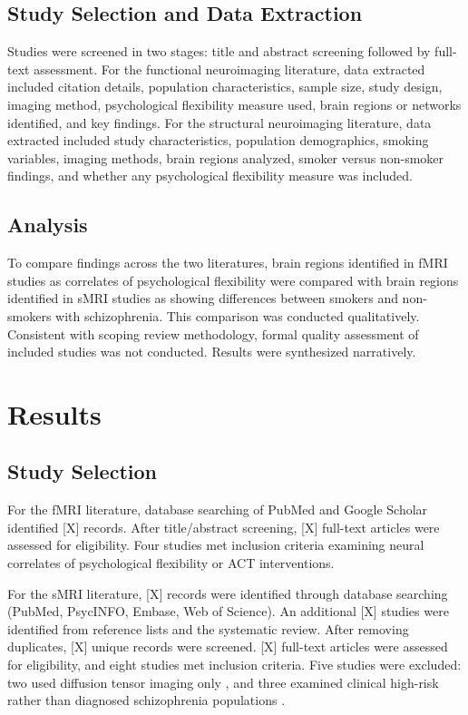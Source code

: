 \documentclass[12pt]{article}
\begin{document}
\subsection{Study Selection and Data Extraction}

Studies were screened in two stages: title and abstract screening followed by full-text assessment. For the functional neuroimaging literature, data extracted included citation details, population characteristics, sample size, study design, imaging method, psychological flexibility measure used, brain regions or networks identified, and key findings. For the structural neuroimaging literature, data extracted included study characteristics, population demographics, smoking variables, imaging methods, brain regions analyzed, smoker versus non-smoker findings, and whether any psychological flexibility measure was included.

\subsection{Analysis}

To compare findings across the two literatures, brain regions identified in fMRI studies as correlates of psychological flexibility were compared with brain regions identified in sMRI studies as showing differences between smokers and non-smokers with schizophrenia. This comparison was conducted qualitatively. Consistent with scoping review methodology, formal quality assessment of included studies was not conducted. Results were synthesized narratively.

\section{Results}

\subsection{Study Selection}

For the fMRI literature, database searching of PubMed and Google Scholar identified [X] records. After title/abstract screening, [X] full-text articles were assessed for eligibility. Four studies met inclusion criteria examining neural correlates of psychological flexibility or ACT interventions.

For the sMRI literature, [X] records were identified through database searching (PubMed, PsycINFO, Embase, Web of Science). An additional [X] studies were identified from reference lists and the \citet{koster2025} systematic review. After removing duplicates, [X] unique records were screened. [X] full-text articles were assessed for eligibility, and eight studies met inclusion criteria. Five studies were excluded: two used diffusion tensor imaging only \citep{zhang2010, cullen2012}, and three examined clinical high-risk rather than diagnosed schizophrenia populations \citep{welch2010, stone2012}.
\end{document}
